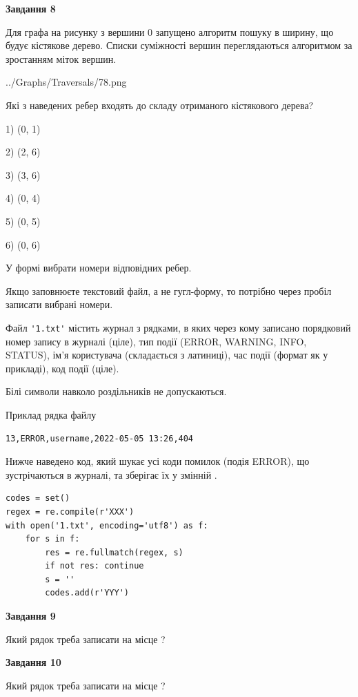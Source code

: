 \documentclass[12pt, ukrainian]{article}
\def\code#1{\Verb!#1!}
\begin{document}
{\begin {large}
{\begin {center}\textbf{Завдання 8}\end {center}}\par
Для графа на рисунку з вершини 0 запущено алгоритм пошуку в ширину, що будує кістякове дерево. Списки суміжності вершин переглядаються алгоритмом за зростанням міток вершин.\par
\begin{center}
	{../Graphs/Traversals/78.png}
\end{center}
\par Які з наведених ребер входять до складу отриманого кістякового дерева?\par
1) (0, 1)\par
2) (2, 6)\par
3) (3, 6)\par
4) (0, 4)\par
5) (0, 5)\par
6) (0, 6)\par
{\vskip 15pt} У формі вибрати номери відповідних ребер.


Якщо заповнюєте текстовий файл, а не гугл-форму, то потрібно через пробіл записа\-ти вибрані номери.\par
\newpage


Файл \code{'1.txt'} містить журнал з рядками, в яких через кому записано поряд\-ко\-вий номер запису в журналі (ціле), тип події (ERROR, WARNING, INFO, STATUS), ім'я користувача (складається з латиниці), час події (фор\-мат як у прикладі), код події (ціле).

Білі символи навколо роздільників не допускаються.

Приклад рядка файлу



\begin{verbatim}
13,ERROR,username,2022-05-05 13:26,404
\end{verbatim}


Нижче наведено код, який шукає усі коди помилок (подія ERROR), що зустріча\-ють\-ся в журналі, та зберігає їх у змінній .



\begin{verbatim}
codes = set()
regex = re.compile(r'XXX')
with open('1.txt', encoding='utf8') as f:
    for s in f:
        res = re.fullmatch(regex, s)
        if not res: continue
        s = ''
        codes.add(r'YYY')
\end{verbatim}


{\begin {center}\textbf{Завдання 9}\end {center}}\par
Який рядок треба записати на місце  ?\par
\vspace{5mm}


{\begin {center}\textbf{Завдання 10}\end {center}}\par
Який рядок треба записати на місце  ?\par


\newpage


\end {large}}
\end{document}
